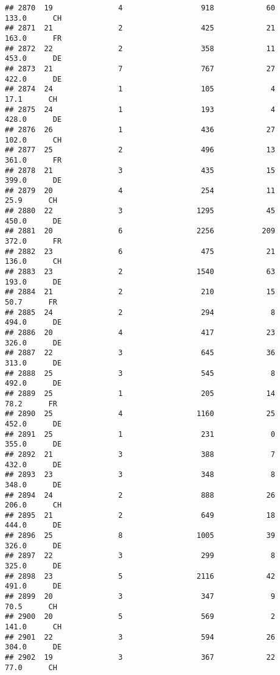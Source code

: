 \documentclass[
]{article}
\begin{document}
\begin{verbatim}
## 2870  19               4                  918            60    133.0      CH
## 2871  21               2                  425            21    163.0      FR
## 2872  22               2                  358            11    453.0      DE
## 2873  21               7                  767            27    422.0      DE
## 2874  24               1                  105             4     17.1      CH
## 2875  24               1                  193             4    428.0      DE
## 2876  26               1                  436            27    102.0      CH
## 2877  25               2                  496            13    361.0      FR
## 2878  21               3                  435            15    399.0      DE
## 2879  20               4                  254            11     25.9      CH
## 2880  22               3                 1295            45    450.0      DE
## 2881  20               6                 2256           209    372.0      FR
## 2882  23               6                  475            21    136.0      CH
## 2883  23               2                 1540            63    193.0      DE
## 2884  21               2                  210            15     50.7      FR
## 2885  24               2                  294             8    494.0      DE
## 2886  20               4                  417            23    326.0      DE
## 2887  22               3                  645            36    313.0      DE
## 2888  25               3                  545             8    492.0      DE
## 2889  25               1                  205            14     78.2      FR
## 2890  25               4                 1160            25    452.0      DE
## 2891  25               1                  231             0    355.0      DE
## 2892  21               3                  388             7    432.0      DE
## 2893  23               3                  348             8    348.0      DE
## 2894  24               2                  888            26    206.0      CH
## 2895  21               2                  649            18    444.0      DE
## 2896  25               8                 1005            39    326.0      DE
## 2897  22               3                  299             8    325.0      DE
## 2898  23               5                 2116            42    491.0      DE
## 2899  20               3                  347             9     70.5      CH
## 2900  20               5                  569             2    141.0      CH
## 2901  22               3                  594            26    304.0      DE
## 2902  19               3                  367            22     77.0      CH

\end{verbatim}
\end{document}
